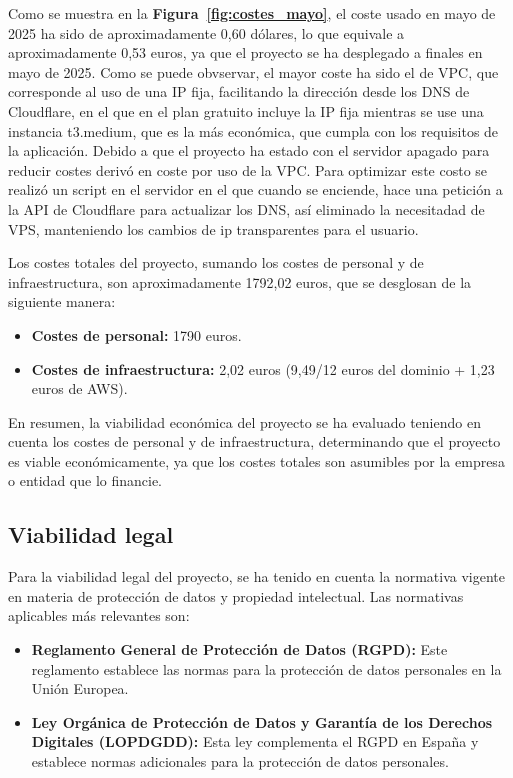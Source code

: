 Como se muestra en la \textbf{Figura~\ref{fig:costes_mayo}}, el coste usado en mayo de 2025 ha sido de aproximadamente 0,60 dólares, lo que equivale a aproximadamente 0,53 euros, ya que el proyecto se ha desplegado a finales en mayo de 2025. Como se puede obvservar, el mayor coste ha sido el de VPC, que corresponde al uso de una IP fija, facilitando la dirección desde los DNS de Cloudflare, en el que en el plan gratuito incluye la IP fija mientras se use una instancia t3.medium, que es la más económica, que cumpla con los requisitos de la aplicación. Debido a que el proyecto ha estado con el servidor apagado para reducir costes derivó en coste por uso de la VPC. Para optimizar este costo se realizó un script en el servidor en el que cuando se enciende, hace una petición a la API de Cloudflare para actualizar los DNS, así eliminado la necesitadad de VPS, manteniendo los cambios de ip transparentes para el usuario.


Los costes totales del proyecto, sumando los costes de personal y de infraestructura, son aproximadamente 1792,02 euros, que se desglosan de la siguiente manera:
\begin{itemize}
    \item \textbf{Costes de personal:} 1790 euros.
    \item \textbf{Costes de infraestructura:} 2,02 euros (9,49/12 euros del dominio + 1,23 euros de AWS).
\end{itemize}


En resumen, la viabilidad económica del proyecto se ha evaluado teniendo en cuenta los costes de personal y de infraestructura, determinando que el proyecto es viable económicamente, ya que los costes totales son asumibles por la empresa o entidad que lo financie.

\subsection{Viabilidad legal}
Para la viabilidad legal del proyecto, se ha tenido en cuenta la normativa vigente en materia de protección de datos y propiedad intelectual.
Las normativas aplicables más relevantes son:
\begin{itemize}
    \item \textbf{Reglamento General de Protección de Datos (RGPD):} Este reglamento establece las normas para la protección de datos personales en la Unión Europea.~\cite{RGPD}
    \item \textbf{Ley Orgánica de Protección de Datos y Garantía de los Derechos Digitales (LOPDGDD):} Esta ley complementa el RGPD en España y establece normas adicionales para la protección de datos personales.~\cite{LOPDGDD}	
\end{itemize}

